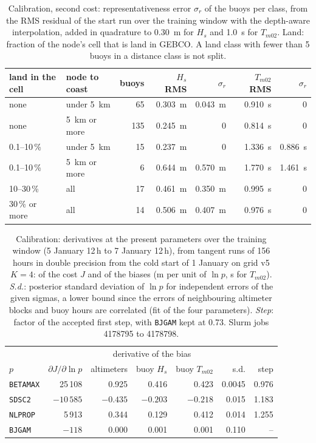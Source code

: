 \documentclass[11pt,a4paper]{article}
\begin{document}
\begin{table}[H]
\centering\small
\begin{tabular}{llrrrrr}
\toprule
land in the cell & node to coast & buoys & $H_s$ RMS & $\sigma_r$ & $T_{m02}$ RMS & $\sigma_r$ \\
\midrule
none & under \SI{5}{km} & 65 & \SI{0.303}{m} & \SI{0.043}{m} & \SI{0.910}{s} & 0 \\
none & \SI{5}{km} or more & 135 & \SI{0.245}{m} & 0 & \SI{0.814}{s} & 0 \\
0.1--10\,\% & under \SI{5}{km} & 15 & \SI{0.237}{m} & 0 & \SI{1.336}{s} & \SI{0.886}{s} \\
0.1--10\,\% & \SI{5}{km} or more & 6 & \SI{0.644}{m} & \SI{0.570}{m} & \SI{1.770}{s} & \SI{1.461}{s} \\
10--30\,\% & all & 17 & \SI{0.461}{m} & \SI{0.350}{m} & \SI{0.995}{s} & 0 \\
30\,\% or more & all & 14 & \SI{0.506}{m} & \SI{0.407}{m} & \SI{0.976}{s} & 0 \\
\bottomrule
\end{tabular}
\caption{Calibration, second cost: representativeness error $\sigma_r$
of the buoys per class, from the RMS residual of the start run over the
training window with the depth-aware interpolation, added in quadrature
to \SI{0.30}{m} for $H_s$ and \SI{1.0}{s} for $T_{m02}$. Land: fraction
of the node's cell that is land in GEBCO. A land class with fewer than 5
buoys in a distance class is not split.}
\label{tab:calsig}
\end{table}

\begin{table}[H]
\centering\small
\begin{tabular}{lrrrrrr}
\toprule
 & & \multicolumn{3}{c}{derivative of the bias} & & \\
$p$ & $\partial J/\partial\ln p$ & altimeters & buoy $H_s$ & buoy $T_{m02}$ & s.d. & step \\
\midrule
\texttt{BETAMAX} & 25\,108 & 0.925 & 0.416 & 0.423 & 0.0045 & 0.976 \\
\texttt{SDSC2} & $-10\,585$ & $-0.435$ & $-0.203$ & $-0.218$ & 0.015 & 1.183 \\
\texttt{NLPROP} & 5\,913 & 0.344 & 0.129 & 0.412 & 0.014 & 1.255 \\
\texttt{BJGAM} & $-118$ & 0.000 & 0.001 & 0.001 & 0.110 & -- \\
\bottomrule
\end{tabular}
\caption{Calibration: derivatives at the present parameters over the
training window (5 January 12\,h to 7 January 12\,h), from tangent runs
of 156 hours in double precision from the cold start of 1 January on grid
v5 $K=4$: of the cost $J$ and of the biases (m per unit of $\ln p$, s for
$T_{m02}$). \emph{S.d.}: posterior standard deviation of $\ln p$ for
independent errors of the given sigmas, a lower bound since the errors of
neighbouring altimeter blocks and buoy hours are correlated (fit of the
four parameters). \emph{Step}: factor of the accepted first step, with
\texttt{BJGAM} kept at 0.73. Slurm jobs 4178795 to 4178798.}
\label{tab:cal0}
\end{table}
\end{document}
